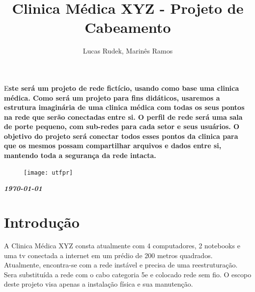 \documentclass[	DIV=calc,%
							paper=a4,%
							fontsize=12pt,%
							onecolumn]{scrartcl}	 					%
\title{Clinica Médica XYZ - Projeto de Cabeamento}					%
\author{Lucas Rudek, Marinês Ramos}  	%
\date{}																				%
\newcommand{\initial}[1]{%
     \lettrine[lines=3,lhang=0.3,nindent=0em]{
     				\color{DarkGoldenrod}
     				{\textsf{#1}}}{}}
\begin{document}
\maketitle
\thispagestyle{fancy} 	
\thispagestyle{empty}		%




\initial{E}\textbf{ste será um projeto de rede fictício, usando como base uma clinica médica.
	Como será um projeto para fins didáticos, usaremos a estrutura imaginária de uma clinica médica com todas os seus pontos na rede que serão conectadas entre si. O perfil de rede será uma sala de porte pequeno, com sub-redes para cada setor e seus usuários. O objetivo do projeto será conectar todos esses pontos da clinica para que os mesmos possam compartilhar arquivos e dados entre si, mantendo toda a segurança da rede intacta.}

\begin{figure}
	\centering
	\texttt{[image: utfpr]}
\end{figure}

\vspace{3cm}
\centerline{\textit{\textbf{\today}}}

\clearpage
    \renewcommand*\listfigurename{Lista de figuras}
\listoffigures

\renewcommand*\listtablename{Lista de tabelas}
\listoftables




\clearpage
\renewcommand{\contentsname}{Sumário}
\tableofcontents
\clearpage

\section{Introdução}
A Clinica Médica XYZ consta atualmente com 4 computadores, 2 notebooks e uma tv conectada a internet em um prédio de 200 metros quadrados. Atualmente, encontra-se com a rede instável e precisa de uma reestruturação. Sera substituída a rede com o cabo categoria 5e e colocado rede sem fio. O escopo deste projeto visa apenas a instalação física e sua manutenção.
\end{document}
